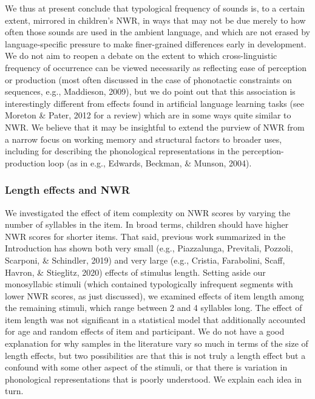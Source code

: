 \documentclass[
  english,
  ,man,floatsintext]{apa6}
\begin{document}
We thus at present conclude that typological frequency of sounds is, to a certain extent, mirrored in children's NWR, in ways that may not be due merely to how often those sounds are used in the ambient language, and which are not erased by language-specific pressure to make finer-grained differences early in development. We do not aim to reopen a debate on the extent to which cross-linguistic frequency of occurrence can be viewed necessarily as reflecting ease of perception or production (most often discussed in the case of phonotactic constraints on sequences, e.g., Maddieson, 2009), but we do point out that this association is interestingly different from effects found in artificial language learning tasks (see Moreton \& Pater, 2012 for a review) which are in some ways quite similar to NWR. We believe that it may be insightful to extend the purview of NWR from a narrow focus on working memory and structural factors to broader uses, including for describing the phonological representations in the perception-production loop (as in e.g., Edwards, Beckman, \& Munson, 2004).

\hypertarget{length-effects-and-nwr}{%
\subsubsection{Length effects and NWR}\label{length-effects-and-nwr}}

We investigated the effect of item complexity on NWR scores by varying the number of syllables in the item. In broad terms, children should have higher NWR scores for shorter items. That said, previous work summarized in the Introduction has shown both very small (e.g., Piazzalunga, Previtali, Pozzoli, Scarponi, \& Schindler, 2019) and very large (e.g., Cristia, Farabolini, Scaff, Havron, \& Stieglitz, 2020) effects of stimulus length. Setting aside our monosyllabic stimuli (which contained typologically infrequent segments with lower NWR scores, as just discussed), we examined effects of item length among the remaining stimuli, which range between 2 and 4 syllables long. The effect of item length was not significant in a statistical model that additionally accounted for age and random effects of item and participant. We do not have a good explanation for why samples in the literature vary so much in terms of the size of length effects, but two possibilities are that this is not truly a length effect but a confound with some other aspect of the stimuli, or that there is variation in phonological representations that is poorly understood. We explain each idea in turn.
\end{document}
